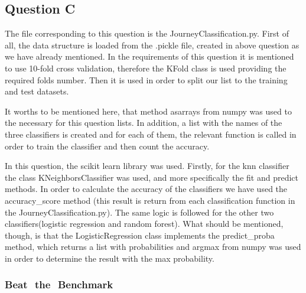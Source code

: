 \documentclass[12pt]{article}
\begin{document}
	\subsection{Question C}
	The file corresponding to this question is the JourneyClassification.py. First of all, the data structure is loaded from the .pickle file, created in above question as we have already mentioned. In the requirements of this question it is mentioned to use 10-fold cross validation, therefore the KFold class is used providing the required folds number. Then it is used in order to split our list to the training and test datasets.
	
	It worths to be mentioned here, that method asarrays from numpy was used to the necessary for this question lists. In addition, a list with the names of the three classifiers is created and for each of them, the relevant function is called in order to train the classifier and then count the accuracy. 
	
	In this question, the scikit learn library was used. Firstly, for the knn classifier the class KNeighborsClassifier was used, and more specifically the fit and predict methods. In order to calculate the accuracy of the classifiers we have used the accuracy\_score method (this result is return from each classification function in the JourneyClassification.py). The same logic is followed for the other two classifiers(logistic regression and random forest). What should be mentioned, though, is that the LogisticRegression class implements the predict\_proba method, which returns a list with probabilities and argmax from numpy was used in order to determine the result with the max probability.
	
	\subsubsection{Beat ​ ​the ​ ​Benchmark}
	
	\newpage
	\begin{thebibliography}{30}
    \end{thebibliography}
	
\end{document}
